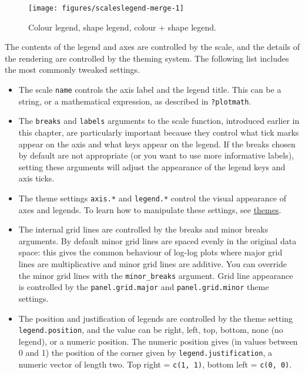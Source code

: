 \begin{figure}
\texttt{[image: figures/scaleslegend-merge-1]} \caption{Colour legend, shape legend, colour + shape legend.\label{fig:legend-merge}}
\end{figure}

The contents of the legend and axes are controlled by the scale, and the
details of the rendering are controlled by the theming system. The
following list includes the most commonly tweaked settings.

\begin{itemize}
\itemsep1pt\parskip0pt
\item
  The scale \texttt{name} controls the axis label and the legend title.
  This can be a string, or a mathematical expression, as described in
  \texttt{?plotmath}.
\item
  The \texttt{breaks} and \texttt{labels} arguments to the scale
  function, introduced earlier in this chapter, are particularly
  important because they control what tick marks appear on the axis and
  what keys appear on the legend. If the breaks chosen by default are
  not appropriate (or you want to use more informative labels), setting
  these arguments will adjust the appearance of the legend keys and axis
  ticks. 
\item
  The theme settings \texttt{axis.*} and \texttt{legend.*} control the
  visual appearance of axes and legends. To learn how to manipulate
  these settings, see \hyperref[sec:themes]{themes}.
\item
  The internal grid lines are controlled by the breaks and minor breaks
  arguments. By default minor grid lines are spaced evenly in the
  original data space: this gives the common behaviour of log-log plots
  where major grid lines are multiplicative and minor grid lines are
  additive. You can override the minor grid lines with the
  \texttt{minor\_breaks} argument. Grid line appearance is controlled by
  the \texttt{panel.grid.major} and \texttt{panel.grid.minor} theme
  settings. 
\item
  The position and justification of legends are controlled by the theme
  setting \texttt{legend.position}, and the value can be right, left,
  top, bottom, none (no legend), or a numeric position. The numeric
  position gives (in values between 0 and 1) the position of the corner
  given by \texttt{legend.justification}, a numeric vector of length
  two. Top right = \texttt{c(1, 1)}, bottom left = \texttt{c(0, 0)}.
\end{itemize}

